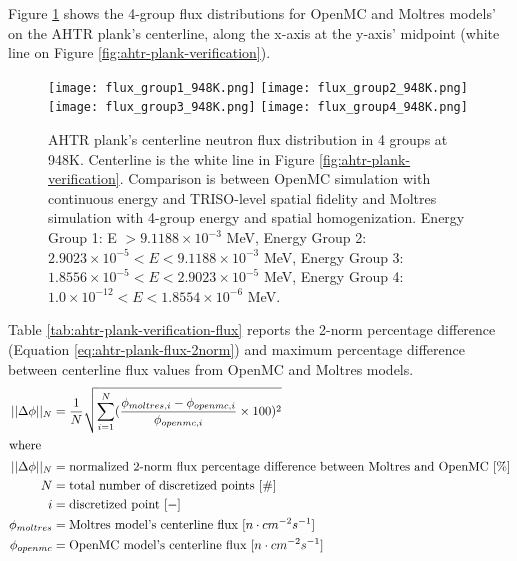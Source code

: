 Figure \ref{fig:flux_948K} shows the 4-group flux distributions for OpenMC and 
Moltres models' on the \gls{AHTR} plank's centerline, along the x-axis at the y-axis' 
midpoint (white line on Figure \ref{fig:ahtr-plank-verification}). 
\begin{figure}[htbp]
    \centering
    \texttt{[image: flux\_group1\_948K.png]} 
    \texttt{[image: flux\_group2\_948K.png]} 
    \texttt{[image: flux\_group3\_948K.png]} 
    \texttt{[image: flux\_group4\_948K.png]} 
    \caption{\acrfull{AHTR} plank's centerline neutron flux distribution 
    in 4 groups at 948K. 
    Centerline is the white line in Figure \ref{fig:ahtr-plank-verification}.
    Comparison is between OpenMC simulation with continuous energy 
    and TRISO-level spatial fidelity and Moltres simulation with 4-group energy and 
    spatial homogenization.  
    Energy Group 1: E $> 9.1188 \times 10^{-3}$ MeV, 
    Energy Group 2: $2.9023 \times 10^{-5} < E < 9.1188 \times 10^{-3}$ MeV,
    Energy Group 3:  $1.8556 \times 10^{-5} < E < 2.9023 \times 10^{-5}$ MeV,
    Energy Group 4:  $1.0 \times 10^{-12} < E < 1.8554 \times 10^{-6}$ MeV.}
    \label{fig:flux_948K}
\end{figure}
Table \ref{tab:ahtr-plank-verification-flux} reports the 2-norm percentage difference 
(Equation \ref{eq:ahtr-plank-flux-2norm}) and maximum percentage difference between 
centerline flux values from OpenMC and Moltres models. 
\begin{align}
    \label{eq:ahtr-plank-flux-2norm}
    ||\Delta \phi||_N &= \frac{1}{N}\sqrt{\sum_{i=1}^N(\frac{\phi_{moltres, i} - \phi_{openmc, i}}{\phi_{openmc, i}}\times100)^2} \\
\intertext{where}
    ||\Delta \phi||_N &= \mbox{normalized 2-norm flux percentage difference between Moltres and OpenMC } [\%] \nonumber \\
    N &= \mbox{total number of discretized points } [\#] \nonumber \\
    i &= \mbox{discretized point } [-] \nonumber \\
    \phi_{moltres} &= \mbox{Moltres model's centerline flux } [n \cdot cm^{-2}s^{-1}] \nonumber \\
    \phi_{openmc} &= \mbox{OpenMC model's centerline flux } [n \cdot cm^{-2}s^{-1}] \nonumber 
\end{align} 
